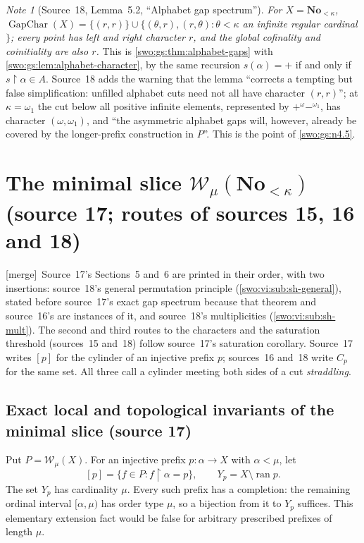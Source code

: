 \documentclass[11pt]{article}
\theoremstyle{definition}
\theoremstyle{remark}
\newtheorem{note}[note]{Note}
\newcommand{\No}{\mathbf{No}}
\newcommand{\WO}{\mathcal W}
\newcommand{\ran}{\operatorname{ran}}
\newcommand{\res}{\mathbin{\upharpoonright}}
\newcommand{\merge}{\textsf{[merge]}}
\newcommand{\GapChar}{\operatorname{GapChar}}
\begin{document}
\begin{note}[Source~18, Lemma~5.2, ``Alphabet gap spectrum'']\label{swo:sh:lem:alphabet-gap-spectrum}
\emph{For $X=\No_{<\kappa}$, $\GapChar(X)=\{(r,r)\}\cup\{(\theta,r),(r,\theta):
\theta<\kappa$ an infinite regular cardinal$\}$; every point has left and right
character $r$, and the global cofinality and coinitiality are also $r$.} This
is \cref{swo:gs:thm:alphabet-gaps} with
\cref{swo:gs:lem:alphabet-character}, by the same recursion $s(\alpha)=+$ if and
only if $s\res\alpha\in A$. Source~18 adds the warning that the lemma
``corrects a tempting but false simplification: unfilled alphabet cuts need
not all have character $(r,r)$''; at $\kappa=\omega_1$ the cut below all
positive infinite elements, represented by $+^\omega-^{\omega_1}$, has
character $(\omega,\omega_1)$, and ``the asymmetric alphabet gaps will,
however, already be covered by the longer-prefix construction in $P$''. This
is the point of \cref{swo:gs:n4.5}.
\end{note}

\section{The minimal slice \texorpdfstring{$\WO_\mu(\No_{<\kappa})$}{W\_mu(No<kappa)} (source 17; routes of sources 15, 16 and 18)}\label{swo:vi:sec:minimal}

\merge\ Source~17's Sections~5 and~6 are printed in their order, with two
insertions: source~18's general permutation principle
(\cref{swo:vi:sub:sh-general}), stated before source~17's exact gap spectrum
because that theorem and source~16's are instances of it, and source~18's
multiplicities (\cref{swo:vi:sub:sh-mult}). The second and third routes to the
characters and the saturation threshold (sources~15 and~18) follow source~17's
saturation corollary. Source~17 writes $[p]$ for the cylinder of an injective
prefix $p$; sources~16 and~18 write $C_p$ for the same set. All three call a
cylinder meeting both sides of a cut \emph{straddling}.

\subsection{Exact local and topological invariants of the minimal slice (source 17)}
\label{swo:gs:sec:topology}

Put $P=\WO_\mu(X)$. For an injective prefix $p:\alpha\to X$ with
$\alpha<\mu$, let
\[
 [p]=\{f\in P:f\res\alpha=p\},\qquad Y_p=X\setminus\ran p.
\]
The set $Y_p$ has cardinality $\mu$. Every such prefix has a completion:
the remaining ordinal interval $[\alpha,\mu)$ has order type $\mu$, so a
bijection from it to $Y_p$ suffices. This elementary extension fact would
be false for arbitrary prescribed prefixes of length $\mu$.
\end{document}
